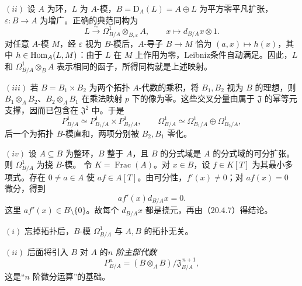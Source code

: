 $(ii)$ 设 $A$ 为环，$L$ 为 $A$-模，$B=\mathrm D_A(L)=A\oplus L$ 为平方零平凡扩张，$\varepsilon:B\to A$ 为增广。正确的典范同构为
\[
 L\xrightarrow{\sim}\Omega^1_{B/A}\otimes_{B,\varepsilon}A,
 \qquad x\longmapsto d_{B/A}x\otimes1.
\]
对任意 $A$-模 $M$，经 $\varepsilon$ 视为 $B$-模后，$A$-导子 $B\to M$ 恰为 $(a,x)\mapsto h(x)$，其中 $h\in\operatorname{Hom}_A(L,M)$：由于 $L$ 在 $M$ 上作用为零，Leibniz条件自动满足。因此，$L$ 和 $\Omega^1_{B/A}\otimes_B A$ 表示相同的函子，所得同构就是上述映射。

$(iii)$ 若 $B=B_1\times B_2$ 为两个拓扑 $A$-代数的乘积，将 $B_1,B_2$ 视为 $B$ 的理想，则 $B_1\otimes_A B_2$、$B_2\otimes_A B_1$ 在乘法映射 $p$ 下的像为零。这些交叉分量由属于 $\mathfrak J$ 的幂等元支撑，因而已包含在 $\mathfrak J^2$ 中。于是
\[
 P^1_{B/A}\simeq P^1_{B_1/A}\times P^1_{B_2/A},\qquad
 \Omega^1_{B/A}\simeq\Omega^1_{B_1/A}\oplus\Omega^1_{B_2/A},
\]
后一个为拓扑 $B$-模直和，两项分别被 $B_2,B_1$ 零化。

$(iv)$ 设 $A\subseteq B$ 为整环，$B$ 整于 $A$，且 $B$ 的分式域是 $A$ 的分式域的可分扩张。则 $\Omega^1_{B/A}$ 为挠 $B$-模。
令 $K=\operatorname{Frac}(A)$。对 $x\in B$，设 $f\in K[T]$ 为其最小多项式。存在 $0\ne a\in A$ 使 $af\in A[T]$。由可分性，$f'(x)\ne0$；对 $af(x)=0$ 微分，得到
\[
 af'(x)d_{B/A}x=0.
\]
这里 $af'(x)\in B\setminus\{0\}$。故每个 $d_{B/A}x$ 都是挠元，再由（20.4.7）得结论。

$(i)$ 忘掉拓扑后，$B$-模 $\Omega^1_{B/A}$ 与 $A,B$ 的拓扑无关。

$(ii)$ 后面将引入 $B$ 对 $A$ 的\emph{$n$ 阶主部代数}
\[
 P^n_{B/A}=(B\otimes_A B)/\mathfrak J_{B/A}^{\,n+1},
\]
这是“$n$ 阶微分运算”的基础。

